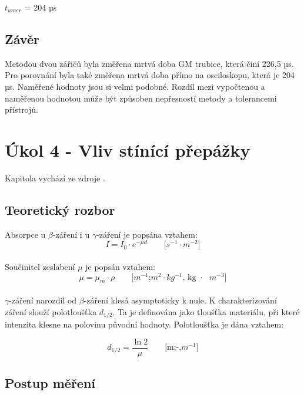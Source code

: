 \documentclass[fleqn]{protokol}
\begin{document}

    $t_{umer}$ = 204 µs
    


    \subsection{Závěr}

    Metodou dvou zářičů byla změřena mrtvá doba GM trubice, která činí 226,5 µs. Pro porovnání byla také změřena mrtvá doba přímo na osciloskopu, která je 204 µs. Naměřené hodnoty jsou si velmi podobné. Rozdíl mezi vypočtenou a naměřenou hodnotou může být způsoben nepřesností metody a tolerancemi přístrojů.

\pagebreak

\section{Úkol 4 - Vliv stínící přepážky}
    Kapitola vychází ze zdroje \cite{navod}.
    \subsection{Teoretický rozbor}

    Absorpce u $\beta$-záření i u $\gamma$-záření je popsána vztahem:
    \begin{equation}   
        I = I_0 \cdot e^{-\mu d}      \quad \quad    \text{[$s^{-1}$$\cdot$$m^{-2}$]}
    \end{equation}
    \\
    Součinitel zeslabení $\mu$ je popsán vztahem:
    \begin{equation}   
        \mu =  \mu_m \cdot \rho      \quad \quad    \text{[$m^{-1}$;$m^2$$\cdot$$kg^{-1}$, kg $\cdot$ $m^{-3}$]}
    \end{equation}
    \\
    $\gamma$-záření narozdíl od $\beta$-záření klesá asymptoticky k nule. K charakterizování záření slouží polotloušťka $d_{1/2}$. Ta je definována jako tloušťka materiálu, při které intenzita klesne na polovinu původní hodnoty. Polotloušťka je dána vztahem\cite{navod}:

    \begin{equation}   
        d_{1/2} =  \dfrac{\ln{2}}{\mu}      \quad \quad    \text{[m;-,$m^{-1}$]}
    \end{equation}

    \subsection{Postup měření}
\end{document}
